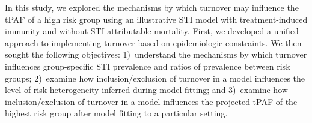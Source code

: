 In this study, we explored the mechanisms by which turnover
may influence the tPAF of a high risk group
using an illustrative STI model
with treatment-induced immunity and without STI-attributable mortality.
First, we developed a unified approach to
implementing turnover based on epidemiologic constraints.
We then sought the following objectives:
1)~understand the mechanisms by which turnover
influences group-specific STI prevalence and ratios of prevalence between risk groups;
2)~examine how inclusion/exclusion of turnover in a model influences
the level of risk heterogeneity inferred during model fitting; and
3)~examine how inclusion/exclusion of turnover in a model influences
the projected tPAF of the highest risk group
after model fitting to a particular setting.